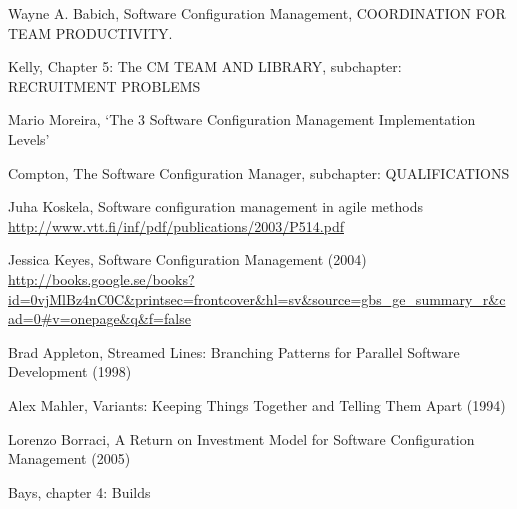 \documentclass[10pt]{article}
\begin{document}
\begin{thebibliography}{1}

 Wayne A. Babich, Software Configuration Management, COORDINATION FOR TEAM PRODUCTIVITY.

 Kelly, Chapter 5: The CM TEAM AND LIBRARY, subchapter: RECRUITMENT PROBLEMS 

 Mario Moreira, ‘The 3 Software Configuration Management Implementation Levels’

Compton, The Software Configuration Manager, subchapter: QUALIFICATIONS

Juha Koskela, Software configuration management in agile methods
\url{http://www.vtt.fi/inf/pdf/publications/2003/P514.pdf}

 Jessica Keyes, Software Configuration Management (2004) \url{http://books.google.se/books?id=0vjMlBz4nC0C&printsec=frontcover&hl=sv&source=gbs_ge_summary_r&cad=0#v=onepage&q&f=false}

 Brad Appleton, Streamed Lines: Branching Patterns for Parallel Software Development (1998)

 Alex Mahler, Variants: Keeping Things Together and Telling Them Apart (1994)

 Lorenzo Borraci, A Return on Investment Model for Software Configuration Management (2005)

 Bays, chapter 4: Builds
\end{thebibliography}
\end{document}
